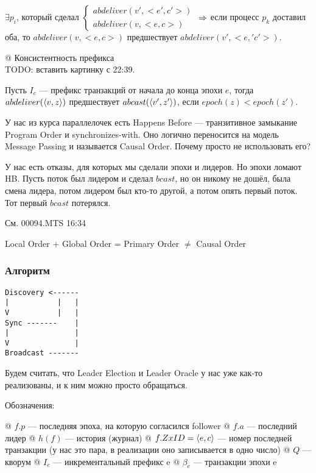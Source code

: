 \begin{el}[ol]
$\exists p_i$, который сделал $\begin{cases} abdeliver(v', <e', c'>)\\ abdeliver(v, <e, c>)\end{cases}$ $\Rightarrow$ если процесс $p_k$ доставил оба, то $abdeliver(v, <e,c>)$ предшествует  $abdeliver(v', <e,' c'>)$.

@ Консистентность префикса\\
TODO: вставить картинку с 22:39.

Пусть $I_e$ --- префикс транзакций от начала до конца эпохи $e$, тогда $abdeliver(\langle v, z\rangle)$ предшествует $abcast(\langle v', z'\rangle)$, если $epoch(z) < epoch(z')$.
\end{el}

\begin{note}
У нас из курса параллелочек есть Happens Before --- транзитивное замыкание Program Order и synchronizes-with. Оно логично переносится на модель Message Passing и называется Causal Order. Почему просто не использовать его?

У нас есть отказы, для которых мы сделали эпохи и лидеров. Но эпохи ломают HB. Пусть поток был лидером и сделал $bcast$, но он никому не дошёл, была смена лидера, потом лидером был кто-то другой, а потом опять первый поток. Тот первый $bcast$ потерялся.

См. 00094.MTS 16:34

Local Order + Global Order = Primary Order $\ne$ Causal Order
\end{note}



\subsubsection{Алгоритм}

\begin{verbatim}
Discovery <------
|           |   |
V           |   |
Sync -------    |
|               |
V               |
Broadcast -------
\end{verbatim}

Будем считать, что Leader Election и Leader Oracle у нас уже как-то реализованы, и к ним можно просто обращаться.

Обозначения:
\begin{el}[ul]
@ $f.p$ --- последняя эпоха, на которую согласился follower
@ $f.a$ --- последний лидер
@ $h(f)$ --- история (журнал)
@ $f.ZxID = \langle e, c\rangle$ --- номер последней транзакции (у нас это пара, в реализации оно записывается в одно число)
@ $Q$ --- кворум
@ $I_e$ --- инкрементальный префикс e
@ $\beta_e$ --- транзакции эпохи e
\end{el}

